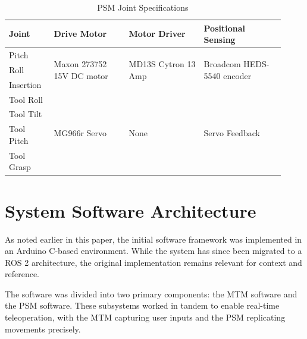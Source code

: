 \begin{table}[htb!]
    \centering
    \caption{PSM Joint Specifications} %
    \label{tab:psm_specs} %
    \begin{tabular}{|p{0.15\linewidth}|p{0.25\linewidth}|p{0.25\linewidth}|p{0.27\linewidth}|}
        \hline
        \textbf{Joint} & \textbf{Drive Motor} & \textbf{Motor Driver} & \textbf{Positional Sensing} \\
        \hline
        Pitch & \multirow{3}{=}{\centering Maxon 273752 15V DC motor} & \multirow{3}{=}{\centering MD13S Cytron 13 Amp} & \multirow{3}{=}{\centering Broadcom HEDS-5540 encoder} \\
        Roll & & & \\
        Insertion & & & \\
        \hline
        Tool Roll & \multirow{4}{=}{\centering MG966r Servo} & \multirow{4}{=}{\centering None} & \multirow{4}{=}{\centering Servo Feedback} \\
        Tool Tilt & & & \\
        Tool Pitch & & & \\
        Tool Grasp & & & \\
        \hline
    \end{tabular}
\end{table}

\section{System Software Architecture}
\label{sec:software_architecture}

As noted earlier in this paper, the initial software framework was implemented in an Arduino C-based environment. While the system has since been migrated to a ROS 2 architecture, the original implementation remains relevant for context and reference.

The software was divided into two primary components: the MTM software and the PSM software. These subsystems worked in tandem to enable real-time teleoperation, with the MTM capturing user inputs and the PSM replicating movements precisely.

